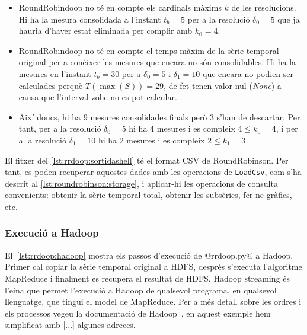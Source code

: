 \begin{itemize}
\item RoundRobindoop no té en compte els cardinals màxims $k$ de les resolucions. Hi ha la mesura consolidada a l'instant $t_b=5$ per a la resolució $\delta_0=5$ que ja hauria d'haver estat eliminada per complir amb $k_0=4$.

\item RoundRobindoop no té en compte el temps màxim de la sèrie
  temporal original per a conèixer les mesures que encara no són
  consolidables. Hi ha la mesures en l'instant $t_b=30$ per a
  $\delta_0=5$ i $\delta_1=10$ que encara no podien ser calculades
  perquè $T(\max(S))=29$, de fet tenen valor nul (\emph{None}) a causa
  que l'interval \gls{zohe} no es pot calcular.

\item Així doncs, hi ha 9 mesures consolidades finals però 3 s'han de
  descartar. Per tant, per a la resolució $\delta_0=5$ hi ha 4 mesures
  i es compleix $4 \leq k_0=4$, i per a la resolució $\delta_1=10$ hi ha 2
  mesures i es compleix $2 \leq k_1=3$.
\end{itemize}


El fitxer del \autoref{lst:rrdoop:sortidashell} té el format \gls{CSV}
de RoundRobinson. Per tant, es poden recuperar aquestes dades amb les
operacions de \verb+LoadCsv+, com s'ha descrit al
\autoref{lst:roundrobinson:storage}, i aplicar-hi les operacions de
consulta convenients: obtenir la sèrie temporal total, obtenir les
subsèries, fer-ne gràfics, etc.



\subsubsection{Execució a Hadoop}


El~\autoref{lst:rrdoop:hadoop} mostra els passos d'execució de
@rrdoop.py@ a Hadoop. Primer cal copiar la sèrie temporal original a
\gls{HDFS}, després s'executa l'algoritme MapReduce i finalment es
recupera el resultat de \gls{HDFS}.  Hadoop streaming és l'eina que
permet l'execució a Hadoop de qualsevol programa, en qualsevol
llenguatge, que tingui el model de MapReduce.
Per a més detall sobre les ordres
i els processos vegeu la documentació de Hadoop~\parencite{hadoop}, en aquest exemple hem simplificat amb [...] algunes adreces.



